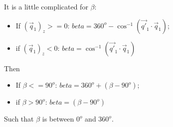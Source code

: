 \documentclass[12pt,bezier,amstex]{report}  %
\begin{document}
It is a little complicated for $\beta$:
\begin{itemize}
\item If $(\vec{q}_1)_z >= 0$: $beta = 360^o - \cos^{-1}(\vec{q\prime}_1\cdot\vec{q}_1)$;
\item if $(\vec{q}_1)_z < 0$: $beta =  \cos^{-1}(\vec{q\prime}_1\cdot\vec{q}_1)$
\end{itemize}
Then
\begin{itemize}
\item If $\beta <= 90^o$: $beta = 360^o + (\beta - 90^o)$;
\item if $\beta > 90^o$: $beta = (\beta - 90^o)$
\end{itemize}
Such that $\beta$ is between $0^o$ and $360^o$.
\end{document}

